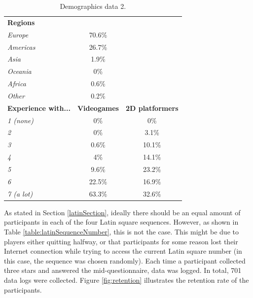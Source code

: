 \begin{table} \centering
\small
\caption{Demographics data 2.}
\label{table:demographics2}
\begin{tabular}{lcc}
\toprule
\textbf{Regions}                      &                & \textbf{}               \\ 
\textit{Europe}                      & 70.6\%         &                         \\
\textit{Americas}                    & 26.7\%         &                         \\
\textit{Asia}                        & 1.9\%          &                         \\
\textit{Oceania}                     & 0\%            &                         \\
\textit{Africa}                      & 0.6\%          &                         \\
\textit{Other}                       & 0.2\%          &                         \\
\textbf{Experience with...} & \textbf{Videogames} & \textbf{2D platformers} \\
\textit{1 (none)}                           & 0\%            & 0\%                     \\
\textit{2}                           & 0\%            & 3.1\%                   \\ 
\textit{3}                           & 0.6\%          & 10.1\%                  \\
\textit{4}                           & 4\%            & 14.1\%                  \\ 
\textit{5}                           & 9.6\%          & 23.2\%                  \\ 
\textit{6}                           & 22.5\%         & 16.9\%                  \\
\textit{7 (a lot)}                           & 63.3\%         & 32.6\%                  \\
\bottomrule
\end{tabular}
\end{table}

As stated in Section \ref{latinSection}, ideally there should be an equal amount of participants in each of the four Latin square sequences. However, as shown in Table \ref{table:latinSequenceNumber}, this is not the case. This might be due to players either quitting halfway, or that participants for some reason lost their Internet connection while trying to access the current Latin square number (in this case, the sequence was chosen randomly). Each time a participant collected three stars and answered the mid-questionnaire, data was logged. In total, 701 data logs were collected. Figure \ref{fig:retention} illustrates the retention rate of the participants.

